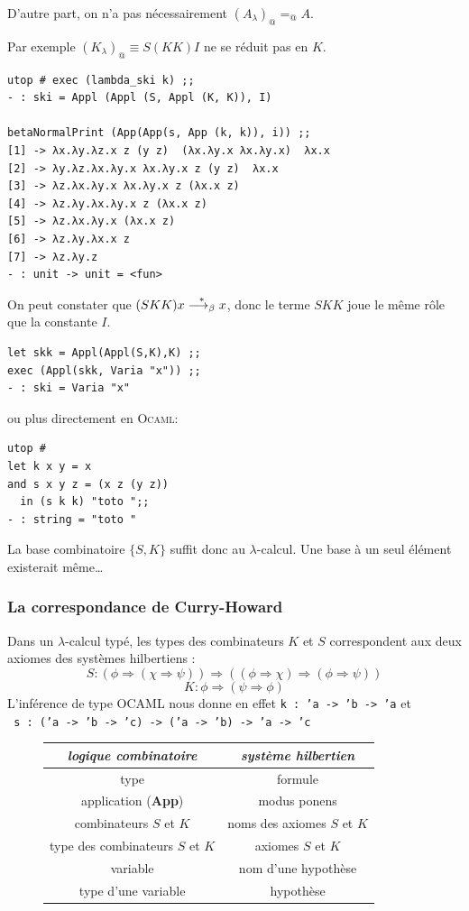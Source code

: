 D'autre part, on n'a pas nécessairement $(A_\lambda)_@ =_@ A$.

Par exemple $(K_\lambda)_@ \equiv S(KK)I$  ne se réduit pas en $K$.
\begin{Verbatim}
utop # exec (lambda_ski k) ;;
- : ski = Appl (Appl (S, Appl (K, K)), I)

betaNormalPrint (App(App(s, App (k, k)), i)) ;;
[1] -> λx.λy.λz.x z (y z)  (λx.λy.x λx.λy.x)  λx.x
[2] -> λy.λz.λx.λy.x λx.λy.x z (y z)  λx.x
[3] -> λz.λx.λy.x λx.λy.x z (λx.x z) 
[4] -> λz.λy.λx.λy.x z (λx.x z) 
[5] -> λz.λx.λy.x (λx.x z) 
[6] -> λz.λy.λx.x z
[7] -> λz.λy.z
- : unit -> unit = <fun>
\end{Verbatim}
On peut constater que $(SKK)x \overset{*}{\longrightarrow_{\beta}} x $, donc le terme $SKK$ joue le même rôle
que la constante $I$. 
\begin{Verbatim}
let skk = Appl(Appl(S,K),K) ;;
exec (Appl(skk, Varia "x")) ;;
- : ski = Varia "x"
\end{Verbatim}
ou plus directement en \textsc{Ocaml}:
\begin{Verbatim}
utop # 
let k x y = x
and s x y z = (x z (y z)) 
  in (s k k) "toto ";;
- : string = "toto "
\end{Verbatim}
La base combinatoire $\{S,K\}$ suffit donc au $\lambda$-calcul. 
Une base à un seul élément existerait même\dots

\subsubsection{La correspondance de Curry-Howard}
Dans un $\lambda$-calcul typé, les types des combinateurs $K$ et $S$ correspondent aux deux axiomes
des systèmes hilbertiens :
$$ S : (\phi \Rightarrow (\chi \Rightarrow \psi)) \Rightarrow ((\phi \Rightarrow \chi) \Rightarrow(\phi \Rightarrow \psi)) 
$$
$$   K : \phi \Rightarrow (\psi \Rightarrow \phi)
$$
L'inférence de type OCAML nous donne en effet 
\texttt{k : 'a -> 'b -> 'a} et  \\ 
\texttt{ s : ('a -> 'b -> 'c) -> ('a -> 'b) -> 'a -> 'c}
\begin{center}
\begin{figure}[H]
	\begin{tabular}{|c|c|} \hline
		\textit{logique combinatoire} & \textit{système hilbertien} \\ \hline
		type & formule \\
		application (\textbf{App}) & modus ponens \\
		combinateurs $S$ et $K$ & noms des axiomes $S$ et $K$ \\
		type des combinateurs $S$ et $K$ & axiomes $S$ et $K$ \\
		variable & nom d'une hypothèse \\
		type d'une variable & hypothèse \\ \hline
	\end{tabular}	
\end{figure}
\end{center}

